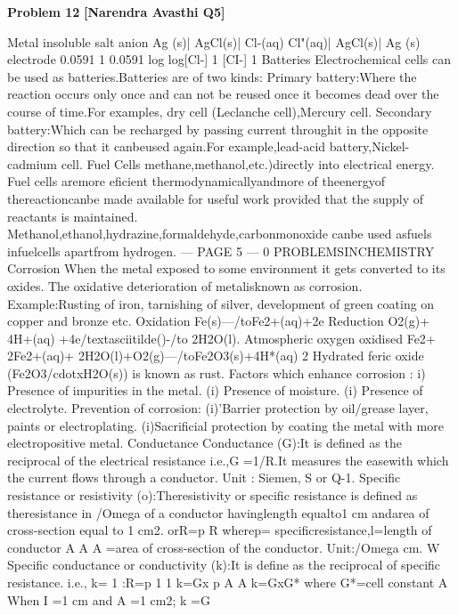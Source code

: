 \begin{problembox}
\textbf{Problem 12} \hfill \textbf{[Narendra Avasthi Q5]}
\label{q:ext-narendra_avasthi_all_questions-12}

Metal insoluble salt anion
Ag (s)| AgCl(s)| Cl-(aq)
Cl"(aq)| AgCl(s)| Ag (s)
electrode
0.0591
1
0.0591
log
log[Cl-]
1
[CI-]
1
Batteries
Electrochemical cells can be used as batteries.Batteries are of two kinds:
Primary battery:Where the reaction occurs only once and can not be reused once it
becomes dead over the course of time.For examples, dry cell (Leclanche cell),Mercury cell.
Secondary battery:Which can be recharged by passing current throughit in the opposite
direction so that it canbeused again.For example,lead-acid battery,Nickel-cadmium cell.
Fuel Cells
methane,methanol,etc.)directly into electrical energy.
Fuel cells aremore eficient thermodynamicallyandmore of theenergyof thereactioncanbe
made available for useful work provided that the supply of reactants is maintained.
Methanol,ethanol,hydrazine,formaldehyde,carbonmonoxide canbe used asfuels infuelcells
apartfrom hydrogen.
--- PAGE 5 ---
0
PROBLEMSINCHEMISTRY
Corrosion
When the metal exposed to some environment it gets converted to its oxides. The oxidative
deterioration of metalisknown as corrosion.
Example:Rusting of iron, tarnishing of silver, development of green coating on copper and
bronze etc.
Oxidation
Fe(s)---/toFe2+(aq)+2e
Reduction
O2(g)+ 4H+(aq) +4e/textasciitilde()-/to 2H2O(l).
Atmospheric oxygen oxidised Fe2+
2Fe2+(aq)+ 2H2O(l)+O2(g)---/toFe2O3(s)+4H*(aq)
2
Hydrated feric oxide (Fe2O3/cdotxH2O(s)) is known as rust.
Factors which enhance corrosion :
i)
Presence of impurities in the metal.
(i) Presence of moisture.
(i) Presence of electrolyte.
Prevention of corrosion:
(i)'Barrier protection by oil/grease layer, paints or electroplating.
(i)Sacrificial protection by coating the metal with more electropositive metal.
Conductance
Conductance (G):It is defined as the reciprocal of the electrical resistance i.e.,G =1/R.It
measures the easewith which the current flows through a conductor.
Unit : Siemen, S or Q-1.
Specific resistance or resistivity (o):Theresistivity or specific resistance is defined as
theresistance in /Omega of a conductor havinglength equalto1 cm andarea of cross-section
equal to 1 cm2.
orR=p
R
wherep= specificresistance,l=length of conductor
A
A
A =area of cross-section of the conductor.
Unit:/Omega cm.
W
Specific conductance or conductivity (k):It is define as the reciprocal of specific
resistance.
i.e.,
k=
1
:R=p
1
1
k=Gx
p
A
A
k=GxG*
where G*=cell constant
A
When I =1 cm and A =1 cm2; k =G

\end{problembox}
